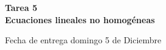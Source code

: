 \documentclass[12pt]{exam}
\begin{document}
\centering


\Large 
\textbf{\huge Tarea 5\\ \large Ecuaciones lineales no homogéneas}

\small
Fecha de entrega domingo 5 de Diciembre
\vskip10pt

\normalsize

\pointformat{\bfseries\boldmath(\thepoints)}
\vskip10pt
\end{document}
